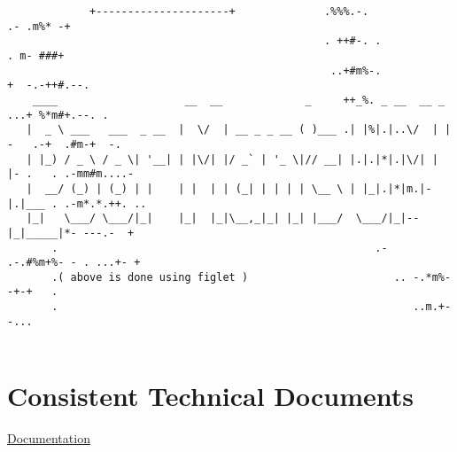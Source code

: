 \documentclass[11pt]{article}
\begin{document}
\begin{verbatim}
             +---------------------+              .%%%.-.                              .- .m%* -+
                                                  . ++#-. .                          . m- ###+
                                                   ..+#m%-.                       +  -.-++#.--.
    ____                    __  __             _     ++_%. _ __  __ _           ...+ %*m#+.--. .
   |  _ \ ___   ___  _ __  |  \/  | __ _ _ __ ( )___ .| |%|.|..\/  | |    -   .-+  .#m-+  -.
   | |_) / _ \ / _ \| '__| | |\/| |/ _` | '_ \|// __| |.|.|*|.|\/| | |- .   . .-mm#m....-
   |  __/ (_) | (_) | |    | |  | | (_| | | | | \__ \ | |_|.|*|m.|-|.|___ . .-m*.*.++. ..
   |_|   \___/ \___/|_|    |_|  |_|\__,_|_| |_| |___/  \___/|_|--|_|_____|*- ---.-  +
       .                                                  .-  .-.#%m+%- - . ...+- +
       .( above is done using figlet )                       .. -.*m%--+-+   .
       .                                                        ..m.+--...


\end{verbatim}
\section{Consistent Technical Documents}
\label{sec:org5137df8}
\href{consistentDoc.org}{Documentation}
\end{document}
